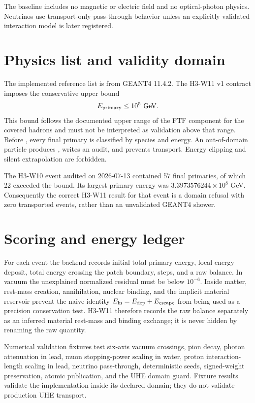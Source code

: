\documentclass[11pt,a4paper]{report}
\numberwithin{equation}{chapter}
\newcommand{\code}[1]{\texttt{\detokenize{#1}}}
\begin{document}
The baseline includes no magnetic or electric field and no optical-photon
physics.  Neutrinos use transport-only pass-through behavior unless an
explicitly validated interaction model is later registered.

\section{Physics list and validity domain}

The implemented reference list is \code{FTFP_BERT} from GEANT4 11.4.2.  The
H3-W11 v1 contract imposes the conservative upper bound
\begin{equation}
 E_{\rm primary} \leq 10^5\ {\rm GeV}.
\end{equation}
This bound follows the documented upper range of the FTF component for the
covered hadrons and must not be interpreted as validation above that range.
Before \code{BeamOn}, every final primary is classified by species and energy.
An out-of-domain particle produces \code{unsupported_domain}, writes an audit,
and prevents transport.  Energy clipping and silent extrapolation are
forbidden.

The H3-W10 event audited on 2026-07-13 contained 57 final primaries, of which
22 exceeded the bound.  Its largest primary energy was
\(3.3973576244\times10^8\) GeV.  Consequently the correct H3-W11 result for
that event is a domain refusal with zero transported events, rather than an
unvalidated GEANT4 shower.

\section{Scoring and energy ledger}

For each event the backend records initial total primary energy, local energy
deposit, total energy crossing the patch boundary, steps, and a raw balance.
In vacuum the unexplained normalized residual must be below \(10^{-6}\).
Inside matter, rest-mass creation, annihilation, nuclear binding, and the
implicit material reservoir prevent the naive identity
\(E_{\rm in}=E_{\rm dep}+E_{\rm escape}\) from being used as a precision
conservation test.  H3-W11 therefore records the raw balance separately as an
inferred material rest-mass and binding exchange; it is never hidden by
renaming the raw quantity.

Numerical validation fixtures test six-axis vacuum crossings, pion decay,
photon attenuation in lead, muon stopping-power scaling in water, proton
interaction-length scaling in lead, neutrino pass-through, deterministic
seeds, signed-weight preservation, atomic publication, and the UHE domain
guard.  Fixture results validate the implementation inside its declared
domain; they do not validate production UHE transport.
\end{document}
